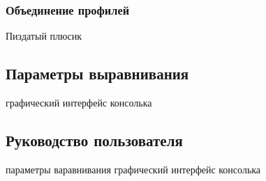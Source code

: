 \subsubsection[Объединение профилей]{\large Объединение профилей}
\hspace{\parindent} Пиздатый плюсик

\subsection[Параметры выравнивания]{\large Параметры выравнивания}
\hspace{\parindent} графический интерфейс консолька

\subsection[Руководство пользователя]{\large Руководство пользователя}
\hspace{\parindent} параметры варавнивания графический интерфейс консолька